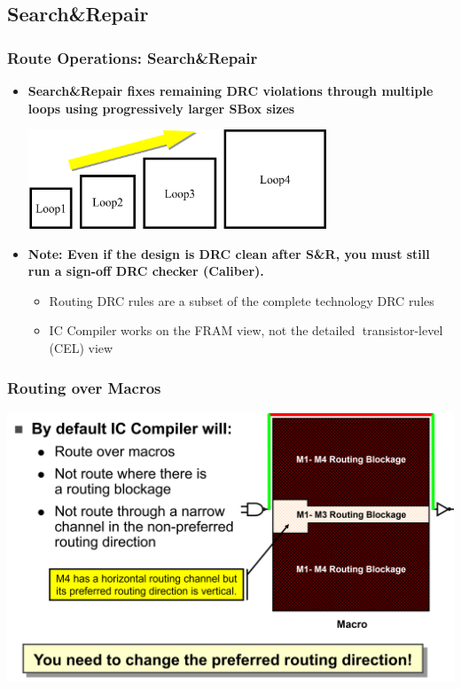 \documentclass[compress]{beamer}
\begin{document}
\subsection[S\&R]{Search\&Repair}
\begin{frame}
	\frametitle{Route Operations: Search\&Repair}
	\begin{itemize}
		\item \textbf{Search\&Repair fixes remaining DRC violations through multiple loops using progressively larger SBox sizes}
		\begin{center}
			\includegraphics[width=0.7\textwidth]{SR}
		\end{center}
	\item \textbf{Note: Even if the design is DRC clean after S\&R, you must still run a sign-off DRC checker (Caliber).}
	\begin{itemize}
		\item Routing DRC rules are a subset of the complete technology DRC rules
		\item IC Compiler works on the FRAM view, not the detailed transistor-level (CEL) view
	\end{itemize}
	\end{itemize}
\end{frame}	

\begin{frame}
	\frametitle{Routing over Macros}
	\begin{center}
		\includegraphics[width=\textwidth]{ro}
	\end{center}
\end{frame}
\end{document}
